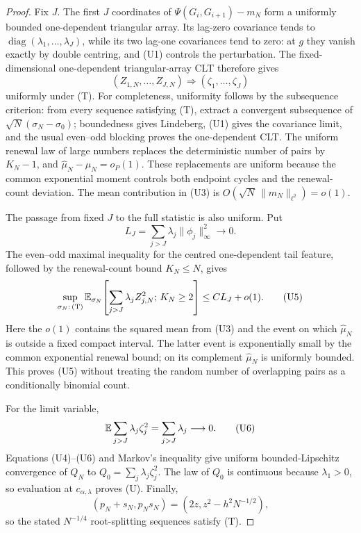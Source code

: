 \begin{proof}
Fix \(J\).  The first \(J\) coordinates of
\(\Psi(G_i,G_{i+1})-m_N\) form a uniformly bounded one-dependent triangular
array.  Its lag-zero covariance tends to
\(\operatorname{diag}(\lambda_1,\ldots,\lambda_J)\), while its two lag-one
covariances tend to zero: at \(g\) they vanish exactly by double centring, and
\textup{(U1)} controls the perturbation.  The fixed-dimensional
one-dependent triangular-array CLT therefore gives
\[
 (Z_{1,N},\ldots,Z_{J,N})
 \Longrightarrow(\zeta_1,\ldots,\zeta_J)
\tag{U4}
\]
uniformly under \textup{(T)}.  For completeness, uniformity follows by the
subsequence criterion: from every sequence satisfying \textup{(T)}, extract
a convergent subsequence of
\(\sqrt N(\sigma_N-\sigma_0)\); boundedness gives Lindeberg, \textup{(U1)}
gives the covariance limit, and the usual even--odd blocking proves the
one-dependent CLT.  The uniform renewal law of large numbers replaces the
deterministic number of pairs by \(K_N-1\), and
\(\widehat\mu_N-\mu_N=o_P(1)\).  These replacements are uniform because the
common exponential moment controls both endpoint cycles and the renewal-count
deviation.  The mean contribution in \textup{(U3)} is
\(O(\sqrt N\,\|m_N\|_{\ell^2})=o(1)\).

The passage from fixed \(J\) to the full statistic is also uniform.  Put
\[
 L_J=\sum_{j>J}\lambda_j\|\phi_j\|_\infty^2\longrightarrow0 .
\]
The even--odd maximal inequality for the centred one-dependent tail feature,
followed by the renewal-count bound \(K_N\le N\), gives
\[
 \sup_{\sigma_N:\,\textup{(T)}}
 \mathbb E_{\sigma_N}\!\left[
 \sum_{j>J}\lambda_jZ_{j,N}^2;\,
 K_N\ge2\right]
 \le C L_J+o(1).
\tag{U5}
\]
Here the \(o(1)\) contains the squared mean from \textup{(U3)} and the event
on which \(\widehat\mu_N\) is outside a fixed compact interval.  The latter
event is exponentially small by the common exponential renewal bound; on its
complement \(\widehat\mu_N\) is uniformly bounded.  This proves
\textup{(U5)} without treating the random number of overlapping pairs as a
conditionally binomial count.

For the limit variable,
\[
 \mathbb E\sum_{j>J}\lambda_j\zeta_j^2
 =\sum_{j>J}\lambda_j\longrightarrow0.
\tag{U6}
\]
Equations \textup{(U4)}--\textup{(U6)} and Markov's inequality give uniform
bounded-Lipschitz convergence of \(Q_N\) to
\(Q_0=\sum_j\lambda_j\zeta_j^2\).  The law of \(Q_0\) is continuous because
\(\lambda_1>0\), so evaluation at \(c_{\alpha,\lambda}\) proves
\textup{(U)}.  Finally,
\[
 (p_N+s_N,p_Ns_N)
 =(2z,z^2-h^2N^{-1/2}),
\]
so the stated \(N^{-1/4}\) root-splitting sequences satisfy \textup{(T)}.
\end{proof}

